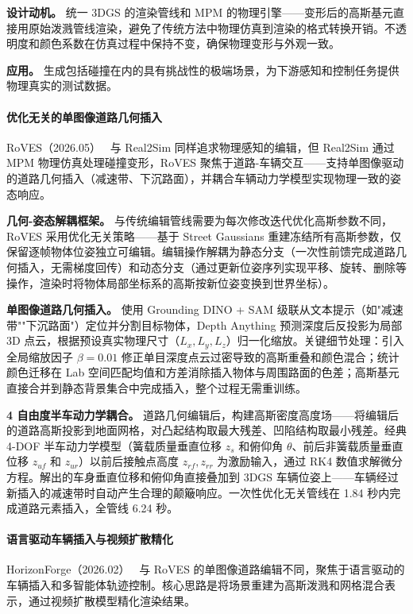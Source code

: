 \textbf{设计动机。} 统一 3DGS 的渲染管线和 MPM 的物理引擎——变形后的高斯基元直接用原始泼溅管线渲染，避免了传统方法中物理仿真到渲染的格式转换开销。不透明度和颜色系数在仿真过程中保持不变，确保物理变形与外观一致。

\textbf{应用。} 生成包括碰撞在内的具有挑战性的极端场景，为下游感知和控制任务提供物理真实的测试数据。

\paragraph{优化无关的单图像道路几何插入}

RoVES（2026.05）~\cite{2605_25373} 与 Real2Sim 同样追求物理感知的编辑，但 Real2Sim 通过 MPM 物理仿真处理碰撞变形，RoVES 聚焦于道路-车辆交互——支持单图像驱动的道路几何插入（减速带、下沉路面），并耦合车辆动力学模型实现物理一致的姿态响应。

\textbf{几何-姿态解耦框架。} 与传统编辑管线需要为每次修改迭代优化高斯参数不同，RoVES 采用优化无关策略——基于 Street Gaussians 重建冻结所有高斯参数，仅保留逐帧物体位姿独立可编辑。编辑操作解耦为静态分支（一次性前馈完成道路几何插入，无需梯度回传）和动态分支（通过更新位姿序列实现平移、旋转、删除等操作，渲染时将物体局部坐标系的高斯按新位姿变换到世界坐标）。

\textbf{单图像道路几何插入。} 使用 Grounding DINO + SAM 级联从文本提示（如"减速带""下沉路面"）定位并分割目标物体，Depth Anything 预测深度后反投影为局部 3D 点云，根据预设真实物理尺寸（$L_x, L_y, L_z$）归一化缩放。关键细节处理：引入全局缩放因子 $\beta = 0.01$ 修正单目深度点云过密导致的高斯重叠和颜色混合；统计颜色迁移在 Lab 空间匹配均值和方差消除插入物体与周围路面的色差；高斯基元直接合并到静态背景集合中完成插入，整个过程无需重训练。

\textbf{4 自由度半车动力学耦合。} 道路几何编辑后，构建高斯密度高度场——将编辑后的道路高斯投影到地面网格，对凸起结构取最大残差、凹陷结构取最小残差。经典 4-DOF 半车动力学模型（簧载质量垂直位移 $z_s$ 和俯仰角 $\theta$、前后非簧载质量垂直位移 $z_{uf}$ 和 $z_{ur}$）以前后接触点高度 $z_{rf}, z_{rr}$ 为激励输入，通过 RK4 数值求解微分方程。解出的车身垂直位移和俯仰角直接叠加到 3DGS 车辆位姿上——车辆经过新插入的减速带时自动产生合理的颠簸响应。一次性优化无关管线在 1.84 秒内完成道路元素插入，全管线 6.24 秒。

\paragraph{语言驱动车辆插入与视频扩散精化}

HorizonForge（2026.02）~\cite{2602_21333} 与 RoVES 的单图像道路编辑不同，聚焦于语言驱动的车辆插入和多智能体轨迹控制。核心思路是将场景重建为高斯泼溅和网格混合表示，通过视频扩散模型精化渲染结果。

